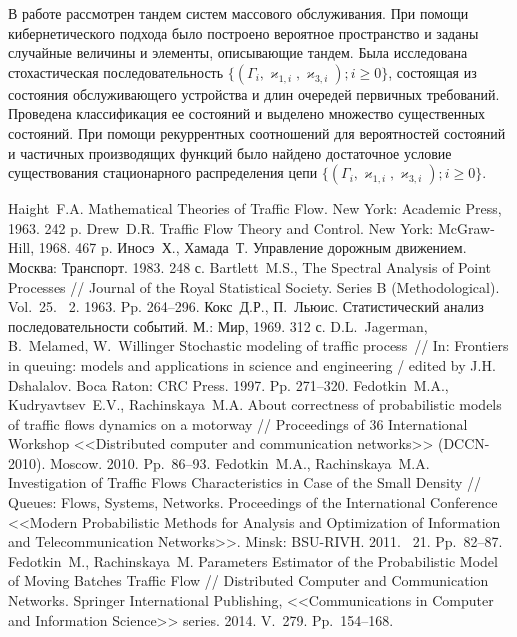 \documentclass[12pt]{extarticle}
\theoremstyle{theorem}
\theoremstyle{remark}
\newcommand{\No}{\textnumero}
\begin{document}
В работе рассмотрен тандем систем массового обслуживания. При помощи кибернетического подхода было построено вероятное пространство и заданы случайные величины и элементы, описывающие тандем. Была исследована стохастическая последовательность $\{(\Gamma_i, \varkappa_{1,i}, \varkappa_{3,i}); i \geqslant 0\}$, состоящая из состояния обслуживающего устройства и длин очередей первичных требований. Проведена классификация ее состояний и выделено множество существенных состояний. При помощи рекуррентных соотношений для вероятностей состояний и частичных производящих функций было найдено достаточное условие существования стационарного распределения цепи  
 $\{(\Gamma_i, \varkappa_{1,i}, \varkappa_{3,i}); i \geqslant 0\}$. 

\bigskip\bigskip{}
\begin{thebibliography}{99}

 Haight~F.A. Mathematical Theories of Traffic Flow. New York: Academic Press, 1963. 242 p.
 Drew~D.R. Traffic Flow Theory and Control. New York: McGraw-Hill, 1968. 467 p.
 Иносэ~Х., Хамада~Т. Управление дорожным движением. Москва: Транспорт. 1983. 248 с.
 Bartlett~M.S., The Spectral Analysis of Point Processes // Journal of the Royal Statistical Society. Series B (Methodological). Vol.~25. \No{}~2. 1963. Pp. 264--296.
 Кокс~Д.Р., П.~Льюис. Статистический анализ последовательности событий. М.: Мир, 1969. 312 с.
 D.L.~Jagerman, B.~Melamed, W.~Willinger  Stochastic modeling of traffic process~// In: Frontiers in queuing: models and applications in science and engineering / edited by J.H. Dshalalov. Boca Raton: CRC Press. 1997. Pp. 271–320.
 Fedotkin~M.A., Kudryavtsev~E.V., Rachinskaya~M.A.  About correctness of probabilistic models of traffic flows dynamics on a motorway // Proceedings of 36 International Workshop <<Distributed computer and communication networks>> (DCCN-2010). Moscow. 2010. Pp.~86--93.
 Fedotkin~M.A., Rachinskaya~M.A. Investigation of Traffic Flows Characteristics in Case of the Small Density // Queues: Flows, Systems, Networks. Proceedings of the International Conference <<Modern Probabilistic Methods for Analysis and Optimization of Information and Telecommunication Networks>>. Minsk: BSU-RIVH. 2011. \No{}~21. Pp.~82--87.
 Fedotkin~M., Rachinskaya~M. Parameters Estimator of the Probabilistic Model of Moving Batches Traffic Flow // Distributed Computer and Communication Networks. Springer International Publishing, <<Communications in Computer and Information Science>> series. 2014. V.~279. Pp.~154--168.


\end{thebibliography}
\end{document}
